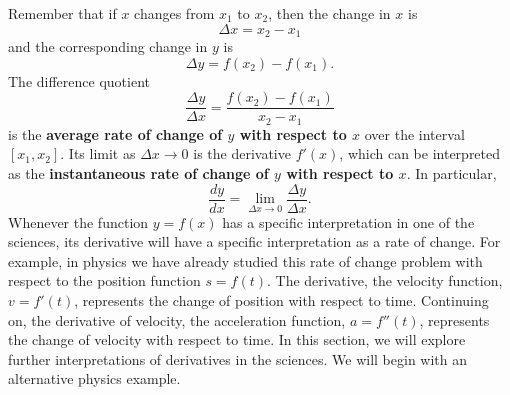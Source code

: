 \documentclass{book}
\begin{document}
Remember that if $x$ changes from $x_1$ to $x_2$, then the change in $x$ is \[\Delta x = x_2 - x_1\] and the corresponding change in $y$ is \[\Delta y = f(x_2) - f(x_1).\] The difference quotient \[\dfrac{\Delta y}{\Delta x} = \dfrac{f(x_2) - f(x_1)}{x_2-x_1}\] is the \textbf{average rate of change of $y$ with respect to $x$} over the interval $[x_1,x_2]$. Its limit as $\Delta x \to 0$ is the derivative $f'(x)$, which can be interpreted as the \textbf{instantaneous rate of change of $y$ with respect to $x$}. In particular, 
\[\dfrac{dy}{dx} = \lim_{\Delta x \to 0} \dfrac{\Delta y}{\Delta x}.\] Whenever the function $y =f(x)$ has a specific interpretation in one of the sciences, its derivative will have a specific interpretation as a rate of change. For example, in physics we have already studied this rate of change problem with respect to the position function $s=f(t)$. The derivative, the velocity function, $v = f'(t)$, represents the change of position with respect to time. Continuing on, the derivative of velocity, the acceleration function, $a = f''(t)$, represents the change of velocity with respect to time. In this section, we will explore further interpretations of derivatives in the sciences. We will begin with an alternative physics example. 
\end{document}
